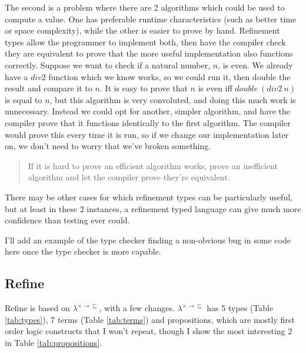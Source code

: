 The second is a problem where there are 2 algorithms which could be used to compute a value.
One has preferable runtime characteristics (such as better time or space complexity), while
the other is easier to prove by hand.
Refinement types allow the programmer to implement both, then have the compiler check they are
equivalent to prove that the more useful implementation also functions correctly.
Suppose we want to check if a natural number, $n$, is even.
We already have a $div2$ function which we know works, so we could run it, then double the
result and compare it to $n$.
It is easy to prove that $n$ is even iff $double\ (div2\ n)$ is equal to $n$, but this algorithm
is very convoluted, and doing this much work is unnecessary.
Instead we could opt for another, simpler algorithm, and have the compiler prove that it functions
identically to the first algorithm.
The compiler would prove this every time it is run, so if we change our implementation later on,
we don't need to worry that we've broken something.
\begin{quote}
    If it is hard to prove an efficient algorithm works, prove an inefficient algorithm and let the
    compiler prove they're equivalent.
\end{quote}

There may be other cases for which refinement types can be particularly useful, but at least in
these 2 instances, a refinement typed language can give much more confidence than testing ever
could.

\begin{itshape}
    I'll add an example of the type checker finding a non-obvious bug in some code here once the
    type checker is more capable.
\end{itshape}

\subsection{Refine}

Refine is based on $\lambda^{\times \rightarrow \sqsubseteq}$, with a few changes.
$\lambda^{\times \rightarrow \sqsubseteq}$ has 5 types (Table \ref{tab:types}),
7 terms (Table \ref{tab:terms}) and propositions, which are mostly first order logic constructs
that I won't repeat, though I show the most interesting 2 in Table \ref{tab:propositions}.

